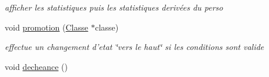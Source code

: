 \begin{DoxyCompactItemize}
\begin{DoxyCompactList}\small\item\em afficher les statistiques puis les statistiques derivées du perso \end{DoxyCompactList}\item 
void \hyperlink{classPersonnage_abc49c5153087cee2e1302e73fb198272}{promotion} (\hyperlink{classClasse}{Classe} $\ast$classe)
\begin{DoxyCompactList}\small\item\em effectue un changement d'etat \char`\"{}vers le haut\char`\"{} si les conditions sont valide \end{DoxyCompactList}\item 
\hypertarget{classPersonnage_abcf2887d6670a7d0486bf08eb0b32304}{void \hyperlink{classPersonnage_abcf2887d6670a7d0486bf08eb0b32304}{decheance} ()}\label{classPersonnage_abcf2887d6670a7d0486bf08eb0b32304}


\end{DoxyCompactItemize}
